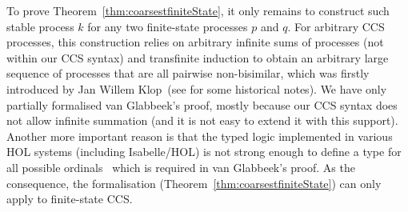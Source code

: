 To prove Theorem~\ref{thm:coarsestfiniteState}, it only remains to construct such stable
process $k$ for any two finite-state processes $p$ and $q$.
For arbitrary CCS processes, this construction relies on
arbitrary infinite sums of processes (not within our CCS syntax) and
transfinite induction to obtain
an arbitrary large sequence of processes that are all pairwise
non-bisimilar,
which was firstly introduced by Jan
Willem Klop~(see \cite{van2005characterisation} for some historical notes).
We have only partially formalised
van Glabbeek's proof, mostly because our CCS syntax does not allow infinite
summation (and it is not easy to extend it with this support).
Another more important reason is that the typed logic
implemented in various HOL systems (including Isabelle/HOL) is not
strong enough to define a type for all possible
ordinals~\cite{norrish2013ordinals} which is required in van
Glabbeek's proof. As the consequence, the formalisation
(Theorem~\ref{thm:coarsestfiniteState})
can only apply to finite-state CCS.

